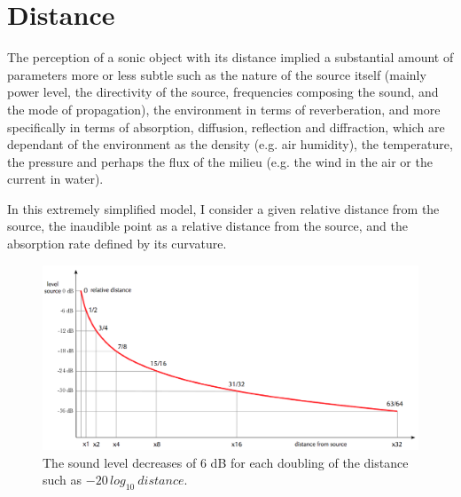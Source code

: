 \documentclass{book}
\begin{document}




\chapter*{Distance}
\label{dist}
\makeatletter 
\renewcommand{\thefigure}{\@arabic\c@figure}
\makeatother

\setcounter{figure}{0} 
The perception of a sonic object with its distance implied a substantial amount of parameters more or less subtle such as the nature of the source itself (mainly power level, the directivity of the source, frequencies composing the sound, and the mode of propagation), the environment in terms of reverberation, and more specifically in terms of absorption, diffusion, reflection and diffraction, which are dependant of the environment as the density (e.g. air humidity), the temperature, the pressure and perhaps the flux of the milieu (e.g. the wind in the air or the current in water). 

\bigskip

In this extremely simplified model, I consider a given relative distance from the source, the inaudible point as a relative distance from the source, and the absorption rate defined by its curvature.

\begin{figure}[H]
\begin{center}
\includegraphics[width=\textwidth]{img/6355}
\caption[]{The sound level decreases of 6 dB for each doubling of the distance such as $-20\,log_{10}\: distance$.
}
\label{fig:dist}
\end{center}
\end{figure}
\end{document}
